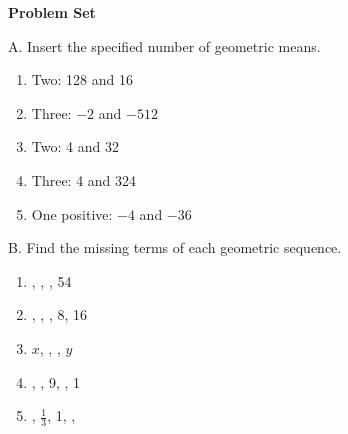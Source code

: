 \textbf{Problem Set}

\vspce

A. Insert the specified number of geometric means.  
\begin{enumerate}[label = \arabic*. ]



	\item \hspce Two: 128 and 16
	\item \hspce Three: $-2$ and $-512$ 
	\item \hspce Two: 4 and 32
	\item \hspce Three: 4 and 324
	\item \hspce One positive: $-4$ and $-36 $
	
\end{enumerate}

\vspce

B. Find the missing terms of each geometric sequence.  

\begin{enumerate}[label = \arabic*. ]
%

\item {}, \blank, \blank, 54
\item \hspce \blank, \blank, \blank, 8, 16
\item \hspce $x$, \blank, \blank, $y$
\item \hspce \blank, \blank, 9, \blank, 1
\item \hspce \blank, $\displaystyle \frac{1}{3}$, 1, \blank, \blank
	
\end{enumerate}
  